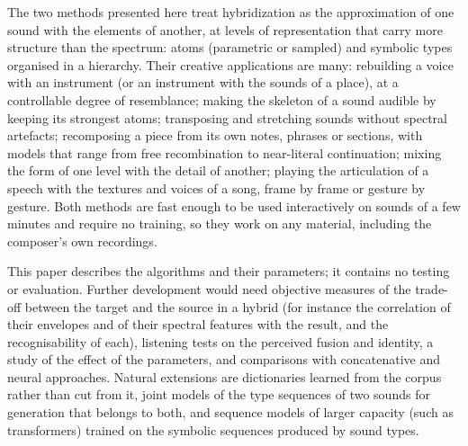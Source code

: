 \documentclass[11pt,a4paper]{article}
\begin{document}
The two methods presented here treat hybridization as the approximation of
one sound with the elements of another, at levels of representation that
carry more structure than the spectrum: atoms (parametric or sampled) and
symbolic types organised in a hierarchy. Their creative applications are
many: rebuilding a voice with an instrument (or an instrument with the
sounds of a place), at a controllable degree of resemblance; making the
skeleton of a sound audible by keeping its strongest atoms; transposing and
stretching sounds without spectral artefacts; recomposing a piece from its
own notes, phrases or sections, with models that range from free
recombination to near-literal continuation; mixing the form of one level
with the detail of another; playing the articulation of a speech with the
textures and voices of a song, frame by frame or gesture by gesture. Both
methods are fast enough to be used interactively on sounds of a few minutes
and require no training, so they work on any material, including the
composer's own recordings.

This paper describes the algorithms and their parameters; it contains no
testing or evaluation. Further development would need objective measures of
the trade-off between the target and the source in a hybrid (for instance
the correlation of their envelopes and of their spectral features with the
result, and the recognisability of each), listening tests on the perceived
fusion and identity, a study of the effect of the parameters, and
comparisons with concatenative and neural approaches. Natural extensions are
dictionaries learned from the corpus rather than cut from it, joint models
of the type sequences of two sounds for generation that belongs to both, and
sequence models of larger capacity (such as transformers) trained on the
symbolic sequences produced by sound types.
\end{document}
